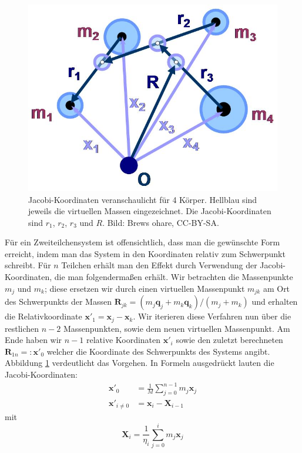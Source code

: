 \documentclass[12pt,a4paper,twoside,open=right,bibliography=totoc]{scrbook}
\renewcommand{\vec}{\mathbf}
\begin{document}
\begin{figure}[tbn]
\centering
\includegraphics[scale=0.5]{img/Four-body_Jacobi_coordinates} %
\caption{Jacobi-Koordinaten veranschaulicht für 4 Körper. Hellblau sind jeweils die virtuellen Massen eingezeichnet. Die Jacobi-Koordinaten sind $r_1$, $r_2$, $r_3$ und $R$. Bild: Brews ohare, CC-BY-SA.}
\label{fig:Jacobi}
\end{figure}
Für ein Zweiteilchensystem ist offensichtlich, dass man die gewünschte Form erreicht, indem man das System in den Koordinaten relativ zum Schwerpunkt schreibt. Für $n$ Teilchen erhält man den Effekt durch Verwendung der Jacobi-Koordinaten, die man folgendermaßen erhält.
Wir betrachten die Massenpunkte $m_j$ und $m_k$; diese ersetzen wir durch einen virtuellen Massenpunkt $m_{jk}$ am Ort des Schwerpunkts der Massen $\vec R_{jk} = (m_j \vec q_j + m_k \vec q_k)/(m_j + m_k)$ und erhalten die Relativkoordinate $\vec x'_{1} = \vec x_j - \vec x_k $.
Wir iterieren diese Verfahren nun über die restlichen $n-2$ Massenpunkten, sowie dem neuen virtuellen Massenpunkt. Am Ende haben wir $n-1$ relative Koordinaten $\vec x'_{i}$ sowie den zuletzt berechneten $\vec R_{1n}=:\vec x'_0$ welcher die Koordinate des Schwerpunkts des Systems angibt.
Abbildung \ref{fig:Jacobi} verdeutlicht das Vorgehen.
In Formeln ausgedrückt lauten die Jacobi-Koordinaten:
\begin{align}
\vec x'_0 &= \frac{1}{M} \sum\limits_{j=0}^{n-1} m_j\vec{x}_j \\
\vec x'_{i\neq0} &= \vec x_i - \vec X_{i-1}
\end{align}
mit
\begin{equation}
\vec X_i = \frac{1}{\eta_i} \sum\limits_{j=0}^{i} m_j\vec{x}_j
\end{equation}
\end{document}

